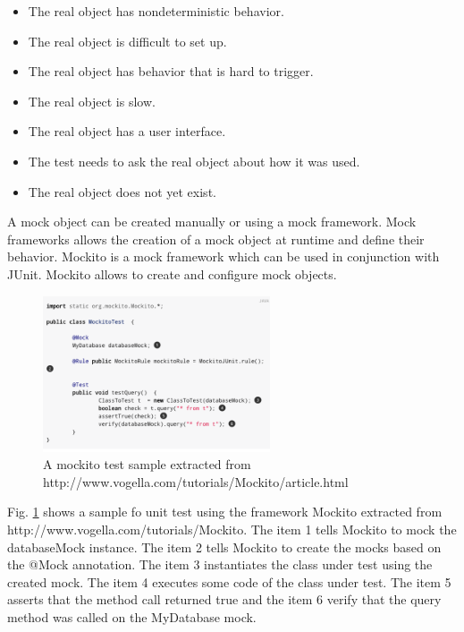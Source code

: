 \documentclass[times]{stvrauth}
\begin{document}
\begin{itemize}
\item The real object has nondeterministic
behavior.
\item The real object is difficult to set up.
\item The real object has behavior that is hard to trigger.
\item The real object is slow.
\item The real object has a user
interface.
\item The test needs to ask the real object
about how it was used.
\item The real object does not yet exist.
\end{itemize}

A mock object can be created manually or using a mock framework. Mock frameworks allows the creation of a mock object at runtime and define their behavior. Mockito is a mock framework which can be used in conjunction with JUnit. Mockito allows to create and configure mock objects. 



\begin{figure}[H]
\centering
\includegraphics[width=0.6\textwidth]{./images/mockito.png}
\caption{A mockito test sample extracted from http://www.vogella.com/tutorials/Mockito/article.html }
\label{fig:mockito}
\end{figure}

Fig. \ref{fig:mockito} shows a sample fo unit test using the framework Mockito extracted from http://www.vogella.com/tutorials/Mockito. The item 1 tells Mockito to mock the databaseMock instance. The item 2 tells Mockito to create the mocks based on the @Mock annotation. The item 3 	instantiates the class under test using the created mock. The item 4 executes some code of the class under test. The item 5 asserts that the method call returned true and the item 6 verify that the query method was called on the MyDatabase mock.
\end{document}
